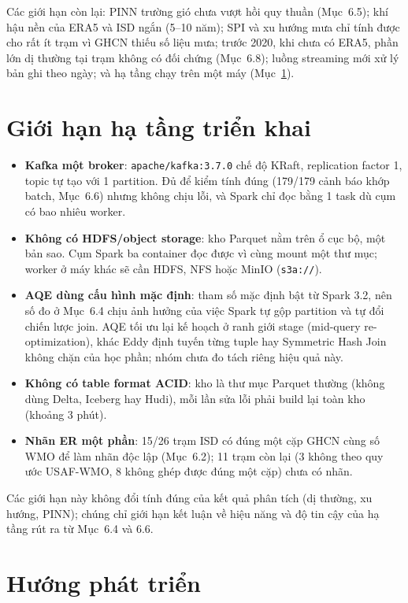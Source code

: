 \documentclass[12pt,a4paper]{report}
\begin{document}
Các giới hạn còn lại: PINN trường gió chưa vượt hồi quy thuần (Mục~6.5); khí hậu nền của ERA5 và ISD
ngắn (5--10 năm); SPI và xu hướng mưa chỉ tính được cho rất ít trạm vì GHCN thiếu số liệu mưa; trước
2020, khi chưa có ERA5, phần lớn dị thường tại trạm không có đối chứng (Mục~6.8); luồng streaming mới
xử lý bản ghi theo ngày; và hạ tầng chạy trên một máy (Mục~\ref{sec:infra-limits}).

\section{Giới hạn hạ tầng triển khai}
\label{sec:infra-limits}

\begin{itemize}
    \item \textbf{Kafka một broker}: \texttt{apache/kafka:3.7.0} chế độ KRaft, replication factor 1,
    topic tự tạo với 1 partition. Đủ để kiểm tính đúng (179/179 cảnh báo khớp batch, Mục~6.6) nhưng
    không chịu lỗi, và Spark chỉ đọc bằng 1 task dù cụm có bao nhiêu worker.
    \item \textbf{Không có HDFS/object storage}: kho Parquet nằm trên ổ cục bộ, một bản sao. Cụm Spark
    ba container đọc được vì cùng mount một thư mục; worker ở máy khác sẽ cần HDFS, NFS hoặc MinIO
    (\texttt{s3a://}).
    \item \textbf{AQE dùng cấu hình mặc định}: tham số  mặc định bật
    từ Spark 3.2, nên số đo ở Mục~6.4 chịu ảnh hưởng của việc Spark tự gộp partition và tự đổi chiến lược join. AQE tối
    ưu lại kế hoạch ở ranh giới stage (mid-query re-optimization), khác Eddy định tuyến từng tuple hay
    Symmetric Hash Join không chặn của học phần; nhóm chưa đo tách riêng hiệu quả này.
    \item \textbf{Không có table format ACID}: kho là thư mục Parquet thường (không dùng Delta, Iceberg hay Hudi),
    mỗi lần sửa lỗi phải build lại toàn kho (khoảng 3 phút).
    \item \textbf{Nhãn ER một phần}: 15/26 trạm ISD có đúng một cặp GHCN cùng số WMO để làm nhãn độc
    lập (Mục~6.2); 11 trạm còn lại (3 không theo quy ước USAF-WMO, 8 không ghép được đúng một cặp)
    chưa có nhãn.
\end{itemize}

Các giới hạn này không đổi tính đúng của kết quả phân tích (dị thường, xu hướng, PINN); chúng chỉ giới
hạn kết luận về hiệu năng và độ tin cậy của hạ tầng rút ra từ Mục~6.4 và 6.6.

\section{Hướng phát triển}
\label{sec:future-work}
\end{document}
